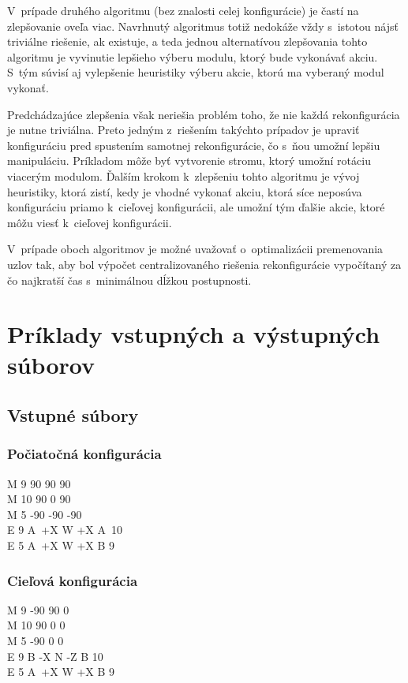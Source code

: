 \documentclass[
  printed, %
  oneside, %
  notable,   %
  nolof,     %
  nolot,     %
]{fithesis3}
\begin{document}
V~prípade druhého algoritmu (bez znalosti celej konfigurácie) je častí na zlepšovanie oveľa viac. Navrhnutý algoritmus totiž nedokáže vždy s~istotou nájsť triviálne riešenie, ak existuje, a teda jednou alternatívou zlepšovania tohto algoritmu je vyvinutie lepšieho výberu modulu, ktorý bude vykonávať akciu. S~tým súvisí aj vylepšenie heuristiky výberu akcie, ktorú ma vyberaný modul vykonať. 

Predchádzajúce zlepšenia však neriešia problém toho, že nie každá rekonfigurácia je nutne triviálna. Preto jedným z~riešením takýchto prípadov je upraviť konfiguráciu pred spustením samotnej rekonfigurácie, čo s~ňou umožní lepšiu manipuláciu. Príkladom môže byť vytvorenie stromu, ktorý umožní rotáciu viacerým modulom. Ďalším krokom k~zlepšeniu tohto algoritmu je vývoj heuristiky, ktorá zistí, kedy je vhodné vykonať akciu, ktorá síce neposúva konfiguráciu priamo k~cieľovej konfigurácii, ale umožní tým ďalšie akcie, ktoré môžu viesť k~cieľovej konfigurácii. 

V~prípade oboch algoritmov je možné uvažovať o~optimalizácii premenovania uzlov tak, aby bol výpočet centralizovaného riešenia rekonfigurácie vypočítaný za čo najkratší čas s~minimálnou dĺžkou postupnosti.


\cleardoublepage
\appendix
\chapter{Príklady vstupných a výstupných súborov}
\label{sec:inOutFiles}
\section{Vstupné súbory}
\subsection{Počiatočná konfigurácia}
M 9 90 90 90 \\
M 10 90 0 90 \\
M 5 -90 -90 -90 \\
E 9 A~+X W +X A~10 \\
E 5 A~+X W +X B 9

\subsection{Cieľová konfigurácia}
M 9 -90 90 0 \\
M 10 90 0 0 \\
M 5 -90 0 0 \\
E 9 B -X N -Z B 10 \\
E 5 A~+X W +X B 9
\end{document}
